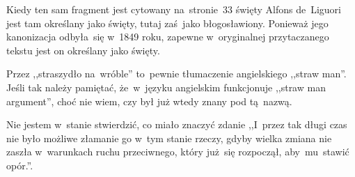 \documentclass[a4paper,11pt]{article}
\begin{document}


\start {} Kiedy ten sam fragment jest cytowany
na~stronie~33 święty Alfons de~Liguori jest tam określany jako święty,
tutaj zaś~jako błogosławiony. Ponieważ jego kanonizacja odbyła~się
w~1849 roku, zapewne w~oryginalnej przytaczanego tekstu jest on
określany jako święty.

\vspace{\spaceFour}


\start {} Przez ,,straszydło na~wróble'' to~pewnie
tłumaczenie angielskiego ,,straw man''. Jeśli tak należy pamiętać,
że~w~języku angielskim funkcjonuje ,,straw man argument'', choć nie
wiem, czy był już wtedy znany pod tą~nazwą.

\vspace{\spaceFour}


\start {} Nie jestem w~stanie stwierdzić, co miało znaczyć
zdanie ,,I~przez tak długi czas nie było możliwe złamanie go w~tym
stanie rzeczy, gdyby wielka zmiana nie zaszła w~warunkach ruchu
przeciwnego, który już~się rozpoczął, aby~mu~stawić opór.''.
\end{document}
